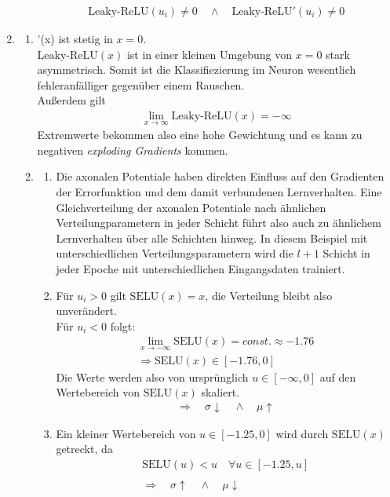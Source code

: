 \documentclass{article}
\newcommand{\leakyrelu}{\text{Leaky-ReLU}}
\newcommand{\elu}{\text{ELU}}
\newcommand{\selu}{\text{SELU}}
\begin{document}
\begin{enumerate}
\begin{enumerate}[label=\alph*)]
\begin{align*}
\leakyrelu(u_i) \neq 0 \quad \wedge \quad \leakyrelu'(u_i) \neq 0
\end{align*}
\end{enumerate}
\item
\begin{enumerate}[label=\alph*)]
\item \elu'(x) ist stetig in $x=0$.\\
$\leakyrelu(x)$ ist in einer kleinen Umgebung von $x=0$ stark asymmetrisch. Somit ist die Klassifiezierung im Neuron wesentlich fehleranfälliger gegenüber einem Rauschen.\\
Außerdem gilt
\begin{align*}
\lim_{x\to \infty} \leakyrelu(x) = -\infty
\end{align*}
Extremwerte bekommen also eine hohe Gewichtung und es kann zu negativen \textit{exploding Gradients} kommen.
\item 
\begin{enumerate}[label=\roman*)]
\item Die axonalen Potentiale haben direkten Einfluss auf den Gradienten der Errorfunktion und dem damit verbundenen Lernverhalten.
Eine Gleichverteilung der axonalen Potentiale nach ähnlichen Verteilungparametern in jeder Schicht führt also auch zu ähnlichem Lernverhalten über alle Schichten hinweg. In diesem Beispiel mit unterschiedlichen Verteilungsparametern wird die $l+1$ Schicht in jeder Epoche mit unterschiedlichen Eingangsdaten trainiert.
\item
Für $u_i>0$ gilt $\selu(x)=x$, die Verteilung bleibt also unverändert.\\
Für $u_i<0$ folgt:
\begin{align*}
\lim_{x\to -\infty} \selu(x) = const. \approx -1.76\\
\Rightarrow \selu(x) \in [-1.76,0] 
\end{align*}
Die Werte werden also von ursprünglich $u\in [-\infty,0]$ auf den Wertebereich von $\selu(x)$ skaliert.
\begin{align*}
\Rightarrow \quad \sigma \downarrow \quad \wedge \quad \mu \uparrow
\end{align*}
\item Ein kleiner Wertebereich von $u \in [-1.25,0]$ wird durch $\selu(x)$ getreckt, da
\begin{align*}
\selu(u)<u \quad \forall u \in [-1.25, u]\\ \\
\Rightarrow \quad \sigma \uparrow \quad \wedge \quad \mu \downarrow

\end{align*}
\end{enumerate}
\end{enumerate}
\end{enumerate}
\end{document}
